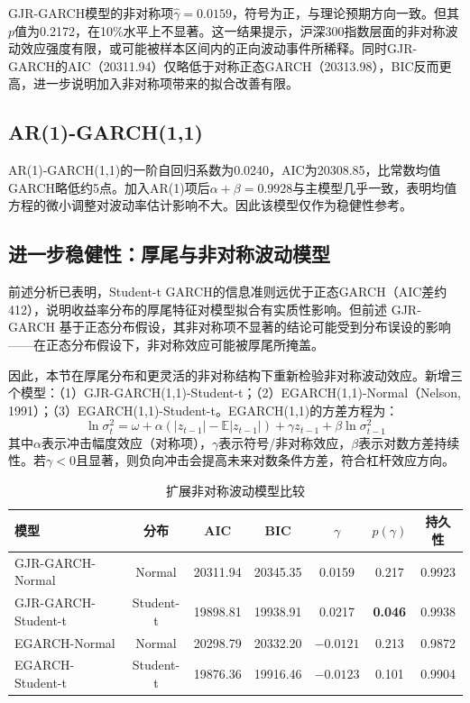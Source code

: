 \documentclass[11pt,a4paper]{article}
\begin{document}
GJR-GARCH模型的非对称项\(\hat{\gamma}=0.0159\)，符号为正，与理论预期方向一致。但其\(p\)值为0.2172，在10\%水平上不显著。这一结果提示，沪深300指数层面的非对称波动效应强度有限，或可能被样本区间内的正向波动事件所稀释。同时GJR-GARCH的AIC（20311.94）仅略低于对称正态GARCH（20313.98），BIC反而更高，进一步说明加入非对称项带来的拟合改善有限。

\subsection{AR(1)-GARCH(1,1)}

AR(1)-GARCH(1,1)的一阶自回归系数为0.0240，AIC为20308.85，比常数均值GARCH略低约5点。加入AR(1)项后\(\alpha+\beta=0.9928\)与主模型几乎一致，表明均值方程的微小调整对波动率估计影响不大。因此该模型仅作为稳健性参考。

\subsection{进一步稳健性：厚尾与非对称波动模型}

前述分析已表明，Student-t GARCH的信息准则远优于正态GARCH（AIC差约412），说明收益率分布的厚尾特征对模型拟合有实质性影响。但前述 GJR-GARCH 基于正态分布假设，其非对称项不显著的结论可能受到分布误设的影响——在正态分布假设下，非对称效应可能被厚尾所掩盖。

因此，本节在厚尾分布和更灵活的非对称结构下重新检验非对称波动效应。新增三个模型：（1）GJR-GARCH(1,1)-Student-t；（2）EGARCH(1,1)-Normal（Nelson, 1991）；（3）EGARCH(1,1)-Student-t。EGARCH(1,1)的方差方程为：
\[
\ln\sigma_t^2 = \omega + \alpha (|z_{t-1}| - \mathbb{E}|z_{t-1}|) + \gamma z_{t-1} + \beta \ln\sigma_{t-1}^2
\]
其中\(\alpha\)表示冲击幅度效应（对称项），\(\gamma\)表示符号/非对称效应，\(\beta\)表示对数方差持续性。若\(\gamma < 0\)且显著，则负向冲击会提高未来对数条件方差，符合杠杆效应方向。

\begin{table}[ht]
\centering
\caption{扩展非对称波动模型比较}
\begin{tabular}{lcccccc}
\toprule
模型 & 分布 & AIC & BIC & \(\gamma\) & \(p(\gamma)\) & 持久性 \\
\midrule
GJR-GARCH-Normal & Normal & 20311.94 & 20345.35 & 0.0159 & 0.217 & 0.9923 \\
GJR-GARCH-Student-t & Student-t & 19898.81 & 19938.91 & 0.0217 & \textbf{0.046} & 0.9938 \\
EGARCH-Normal & Normal & 20298.79 & 20332.20 & $-0.0121$ & 0.213 & 0.9872 \\
EGARCH-Student-t & Student-t & 19876.36 & 19916.46 & $-0.0123$ & 0.101 & 0.9904 \\
\bottomrule
\end{tabular}
\end{table}
\end{document}
